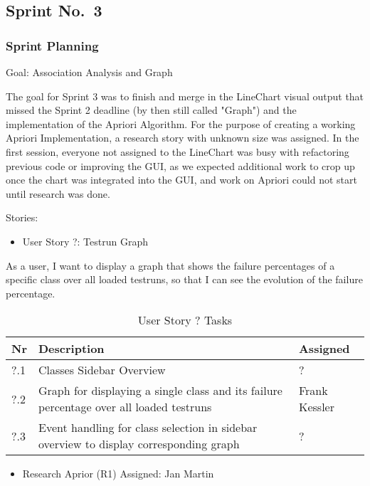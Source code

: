 \subsection{Sprint No.~3}

\subsubsection*{Sprint Planning}

Goal: Association Analysis and Graph

The goal for Sprint 3 was to finish and merge in the LineChart visual output that missed the Sprint 2 deadline (by then still called "Graph") and the implementation of the Apriori Algorithm. 
For the purpose of creating a working Apriori Implementation, a research story with unknown size was assigned. 
In the first session, everyone not assigned to the LineChart was busy with refactoring previous code or improving the GUI, as we expected additional work to crop up once the chart was integrated into the GUI, and work on Apriori could not start until research was done.

Stories: 

\begin{itemize}
	\item User Story ?: Testrun Graph
	\end{itemize}
As a user,
I want to display a graph that shows the failure percentages of a specific class over all loaded testruns, so that I can see the evolution of the failure percentage.
\begin{table}[h]
  \caption{User Story ? Tasks}
  \label{Story ? Tasks}
  \centering
  \begin{tabular}{p{1cm}|p{5cm}|p{3cm}|}
  	Nr & Description & Assigned \\ 
  	\hline
  	?.1 & Classes Sidebar Overview & ? \\ 
  	\hline
  	?.2 & Graph for displaying a single class and its failure percentage over all loaded testruns & Frank Kessler \\ 
  	\hline
  	?.3 & Event handling for class selection in sidebar overview to display corresponding graph & ? \\ 
  	\hline
  \end{tabular}
\end{table}
	
\begin{itemize}	
	\item Research Aprior (R1) Assigned: Jan Martin
\end{itemize}

